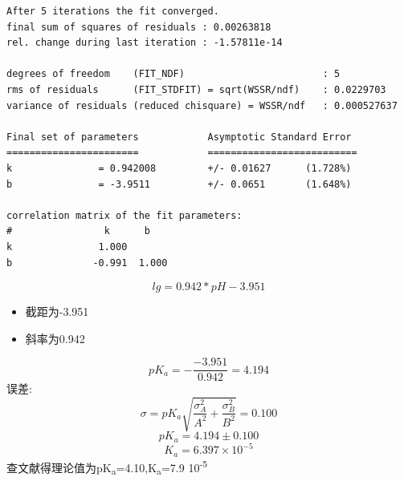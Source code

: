 \documentclass[11pt]{report}
\begin{document}
\begin{enumerate}
\begin{verbatim}
After 5 iterations the fit converged.
final sum of squares of residuals : 0.00263818
rel. change during last iteration : -1.57811e-14

degrees of freedom    (FIT_NDF)                        : 5
rms of residuals      (FIT_STDFIT) = sqrt(WSSR/ndf)    : 0.0229703
variance of residuals (reduced chisquare) = WSSR/ndf   : 0.000527637

Final set of parameters            Asymptotic Standard Error
=======================            ==========================
k               = 0.942008         +/- 0.01627      (1.728%)
b               = -3.9511          +/- 0.0651       (1.648%)

correlation matrix of the fit parameters:
#                k      b      
k               1.000 
b              -0.991  1.000 

\end{verbatim}
\[
lg=0.942*pH-3.951
\]
\begin{itemize}
\item 截距为-3.951
\item 斜率为0.942
\end{itemize}
\[
pK_{a}=-\frac{-3.951}{0.942}=4.194
\]
误差:
\[
\sigma=pK_{a}\sqrt{\frac{\sigma_{A}^{2}}{A^{2}}+\frac{\sigma_{B}^{2}}{B^{2}}}=0.100
\]
\[
pK_{a}=4.194\pm 0.100
\]
\[
K_{a}=6.397\times 10^{-5}
\]
查文献得理论值为pK\textsubscript{a}=4.10,K\textsubscript{a}=7.9\texttimes{} 10\textsuperscript{-5}


\end{enumerate}
\end{document}
